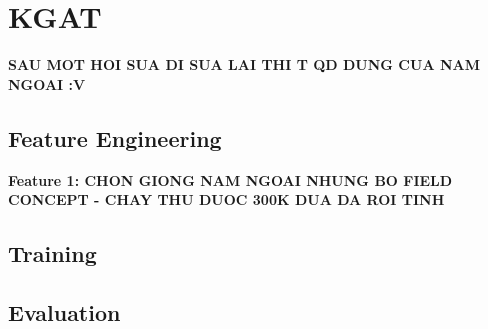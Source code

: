 \section{KGAT}
\textbf{SAU MOT HOI SUA DI SUA LAI THI T QD DUNG CUA NAM NGOAI :V }\\
\subsection{Feature Engineering}
\textbf{Feature 1: CHON GIONG NAM NGOAI NHUNG BO FIELD CONCEPT - CHAY THU DUOC 300K DUA DA ROI TINH}\\
\subsection{Training}
\subsection{Evaluation}